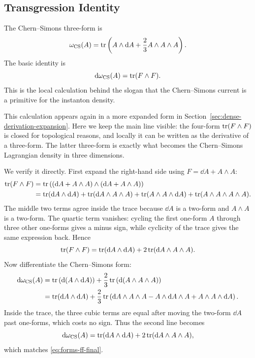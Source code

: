 \subsection{Transgression Identity}
\label{subsec:transgression-identity}

The Chern--Simons three-form is
\begin{equation}
  \omega_{\operatorname{CS}}(A)
  =
  \operatorname{tr}\left(A\wedge\mathrm{d} A+\frac23 A\wedge A\wedge A\right).
  \label{eq:forms-cs-three-form}
\end{equation}
The basic identity is
\begin{equation}
  \mathrm{d}\omega_{\operatorname{CS}}(A)=\operatorname{tr}(F\wedge F).
  \label{eq:forms-transgression}
\end{equation}
This is the local calculation behind the slogan that the Chern--Simons current is a primitive for the instanton density.

This calculation appears again in a more expanded form in Section~\ref{sec:dense-derivation-expansion}. Here we keep the main line visible: the four-form $\operatorname{tr}(F\wedge F)$ is closed for topological reasons, and locally it can be written as the derivative of a three-form. The latter three-form is exactly what becomes the Chern--Simons Lagrangian density in three dimensions.

We verify it directly. First expand the right-hand side using $F=\dd A+A\wedge A$:
\begin{align}
  \operatorname{tr}(F\wedge F)
  &=
  \operatorname{tr}\left((\mathrm{d} A+A\wedge A)\wedge(\mathrm{d} A+A\wedge A)\right)
  \notag\\
  &=
  \operatorname{tr}(\mathrm{d} A\wedge\mathrm{d} A)
  +\operatorname{tr}(\mathrm{d} A\wedge A\wedge A)
  +\operatorname{tr}(A\wedge A\wedge\mathrm{d} A)
  +\operatorname{tr}(A\wedge A\wedge A\wedge A).
  \label{eq:forms-ff-expand}
\end{align}
The middle two terms agree inside the trace because $\dd A$ is a two-form and $A\wedge A$ is a two-form. The quartic term vanishes: cycling the first one-form $A$ through three other one-forms gives a minus sign, while cyclicity of the trace gives the same expression back. Hence
\begin{equation}
  \operatorname{tr}(F\wedge F)
  =
  \operatorname{tr}(\mathrm{d} A\wedge\mathrm{d} A)
  +
  2\operatorname{tr}(\mathrm{d} A\wedge A\wedge A).
  \label{eq:forms-ff-final}
\end{equation}
Now differentiate the Chern--Simons form:
\begin{align}
  \mathrm{d}\omega_{\operatorname{CS}}(A)
  &=
  \operatorname{tr}\left(\mathrm{d}(A\wedge\mathrm{d} A)\right)
  +
  \frac23\operatorname{tr}\left(\mathrm{d}(A\wedge A\wedge A)\right)
  \notag\\
  &=
  \operatorname{tr}(\mathrm{d} A\wedge\mathrm{d} A)
  +
  \frac23\operatorname{tr}\left(\mathrm{d} A\wedge A\wedge A
  -A\wedge\mathrm{d} A\wedge A
  +A\wedge A\wedge\mathrm{d} A\right).
  \label{eq:forms-dcs-intermediate}
\end{align}
Inside the trace, the three cubic terms are equal after moving the two-form $\dd A$ past one-forms, which costs no sign. Thus the second line becomes
\begin{equation}
  \mathrm{d}\omega_{\operatorname{CS}}(A)
  =
  \operatorname{tr}(\mathrm{d} A\wedge\mathrm{d} A)
  +
  2\operatorname{tr}(\mathrm{d} A\wedge A\wedge A),
  \label{eq:forms-dcs-final}
\end{equation}
which matches \eqref{eq:forms-ff-final}.

